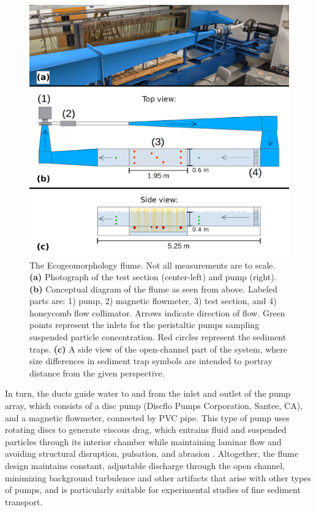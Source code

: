 \documentclass[geosciences,article,submit,moreauthors,pdftex]{Definitions/mdpi}
\begin{document}
\begin{figure}[htb]
\includegraphics[width=5in]{../pics/flume_with_sedtraps.png}
\centering
\caption{The Ecogeomorphology flume. Not all measurements are to scale. \textbf{(a)} Photograph of the test section (center-left) and pump (right). \textbf{(b)} Conceptual diagram of the flume as seen from above. Labeled parts are: 1) pump, 2) magnetic flowmeter, 3) test section, and 4) honeycomb flow collimator. Arrows indicate direction of flow. Green points represent the inlets for the peristaltic pumps sampling suspended particle concentration. Red circles represent the sediment traps. \textbf{(c)} A side view of the open-channel part of the system, where size differences in sediment trap symbols are intended to portray distance from the given perspective.}
\label{fig:floorplan}
\end{figure}

In turn, the ducts guide water to and from the inlet and outlet of the pump array, which consists of a disc pump (Discflo Pumps Corporation, Santee, CA), and a magnetic flowmeter, connected by PVC pipe. This type of pump uses rotating discs to generate viscous drag, which entrains fluid and suspended particles through its interior chamber while maintaining laminar flow and avoiding structural disruption, pulsation, and abrasion \cite{discflo}. Altogether, the flume design maintains constant, adjustable discharge through the open channel, minimizing background turbulence and other artifacts that arise with other types of pumps, and is particularly suitable for experimental studies of fine sediment transport.
\end{document}
